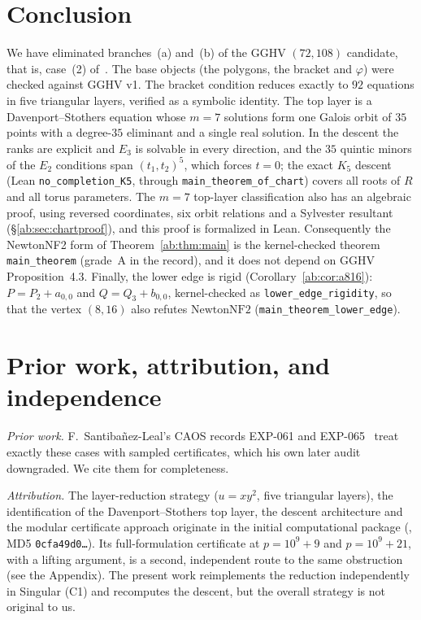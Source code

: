 \documentclass[a4paper,11pt]{article}
\newcommand{\filename}[1]{\texttt{\seqsplit{#1}}}
\theoremstyle{jsplain}
\theoremstyle{jsdef}
\theoremstyle{jsrem}
\begin{document}
\section{Conclusion}\label{ab:sec:conclusion}

We have eliminated branches~(a) and~(b) of the GGHV $(72,108)$ candidate, that is, case~(2) of~\cite[Proposition~4.3]{GGHV}. The base objects (the polygons, the bracket and $\varphi$) were checked against GGHV v1. The bracket condition reduces exactly to $92$ equations in five triangular layers, verified as a symbolic identity. The top layer is a Davenport--Stothers equation whose $m=7$ solutions form one Galois orbit of $35$ points with a degree-$35$ eliminant and a single real solution. In the descent the ranks are explicit and $E_3$ is solvable in every direction, and the $35$ quintic minors of the $E_2$ conditions span $(t_1,t_2)^5$, which forces $t=0$; the exact $K_5$ descent (Lean \texttt{no\_\allowbreak{}completion\_\allowbreak{}K5}, through \texttt{main\_\allowbreak{}theorem\_\allowbreak{}of\_\allowbreak{}chart}) covers all roots of $R$ and all torus parameters. The $m=7$ top-layer classification also has an algebraic proof, using reversed coordinates, six orbit relations and a Sylvester resultant (\S\ref{ab:sec:chartproof}), and this proof is formalized in Lean. Consequently the NewtonNF2 form of Theorem~\ref{ab:thm:main} is the kernel-checked theorem \texttt{main\_\allowbreak{}theorem} (grade~A in the record), and it does not depend on GGHV Proposition~4.3. Finally, the lower edge is rigid (Corollary~\ref{ab:cor:a816}): $P=P_2+a_{0,0}$ and $Q=Q_3+b_{0,0}$, kernel-checked as \texttt{lower\_\allowbreak{}edge\_\allowbreak{}rigidity}, so that the vertex $(8,16)$ also refutes $\mathrm{NewtonNF2}$ (\texttt{main\_\allowbreak{}theorem\_\allowbreak{}lower\_\allowbreak{}edge}).

\section{Prior work, attribution, and independence}\label{ab:sec:attribution}

\emph{Prior work.} F.~Santiba\~nez-Leal's CAOS records EXP-061 and EXP-065~\cite{Santibanez} treat exactly these cases with sampled certificates, which his own later audit downgraded. We cite them for completeness.

\emph{Attribution.} The layer-reduction strategy ($u=xy^2$, five triangular layers), the identification of the Davenport--Stothers top layer, the descent architecture and the modular certificate approach originate in the initial computational package (\filename{branch\_ab\_elimination.zip}, MD5 \texttt{0cfa49d0\dots}). Its full-formulation certificate at $p=10^9+9$ and $p=10^9+21$, with a lifting argument, is a second, independent route to the same obstruction (see the Appendix). The present work reimplements the reduction independently in {\sc Singular} (C1) and recomputes the descent, but the overall strategy is not original to us.
\end{document}
